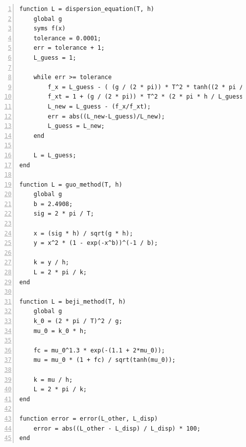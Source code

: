 \documentclass[a4paper, 11pt]{article}
\begin{document}
\begin{lstlisting}[frame=single, numbers=left, style=Matlab-Pyglike]
% Functions
function L = dispersion_equation(T, h)
    global g
    syms f(x)
    tolerance = 0.0001;
    err = tolerance + 1;
    L_guess = 1;
    
    while err >= tolerance 
        f_x = L_guess - ( (g / (2 * pi)) * T^2 * tanh((2 * pi / L_guess) * h ) );
        f_xt = 1 + (g / (2 * pi)) * T^2 * (2 * pi * h / L_guess^2) * sech((2 * pi / L_guess) * h)^2;
        L_new = L_guess - (f_x/f_xt);
        err = abs((L_new-L_guess)/L_new);
        L_guess = L_new;
    end
    
    L = L_guess;
end

function L = guo_method(T, h)
    global g
    b = 2.4908;
    sig = 2 * pi / T;
    
    x = (sig * h) / sqrt(g * h);
    y = x^2 * (1 - exp(-x^b))^(-1 / b);
    
    k = y / h;
    L = 2 * pi / k;
end

function L = beji_method(T, h)
    global g
    k_0 = (2 * pi / T)^2 / g;
    mu_0 = k_0 * h;
    
    fc = mu_0^1.3 * exp(-(1.1 + 2*mu_0));
    mu = mu_0 * (1 + fc) / sqrt(tanh(mu_0));
    
    k = mu / h;
    L = 2 * pi / k;
end

function error = error(L_other, L_disp)
    error = abs((L_other - L_disp) / L_disp) * 100;
end
\end{lstlisting}
\end{document}
